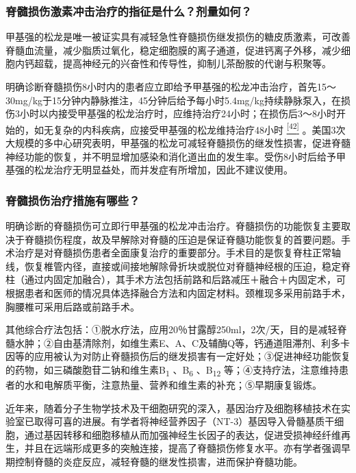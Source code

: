 \subsubsection{脊髓损伤激素冲击治疗的指征是什么？剂量如何？}

甲基强的松龙是唯一被证实具有减轻急性脊髓损伤继发损伤的糖皮质激素，可改善脊髓血流量，减少脂质过氧化，稳定细胞膜的离子通道，促进钙离子外移，减少细胞内钙超载，提高神经元的兴奋性和传导性，抑制儿茶酚胺的代谢与积聚等。

明确诊断脊髓损伤8小时内的患者应立即给予甲基强的松龙冲击治疗，首先15～30mg/kg于15分钟内静脉推注，45分钟后给予每小时5.4mg/kg持续静脉泵入，在损伤3小时以内接受甲基强的松龙治疗时，应维持治疗24小时；在损伤后3～8小时开始的，如无复杂的内科疾病，应接受甲基强的松龙维持治疗48小时
\protect\hyperlink{text00024.htmlux5cux23ch42-23}{\textsuperscript{{[}42{]}}}
。美国3次大规模的多中心研究表明，甲基强的松龙可减轻脊髓损伤的继发性损害，促进脊髓神经功能的恢复，并不明显增加感染和消化道出血的发生率。受伤8小时后给予甲基强的松龙治疗无明显益处，而并发症有所增加，因此不建议使用。

\subsubsection{脊髓损伤治疗措施有哪些？}

明确诊断的脊髓损伤可立即行甲基强的松龙冲击治疗。脊髓损伤的功能恢复主要取决于脊髓损伤程度，故及早解除对脊髓的压迫是保证脊髓功能恢复的首要问题。手术治疗是对脊髓损伤患者全面康复治疗的重要部分。手术目的是恢复脊柱正常轴线，恢复椎管内径，直接或间接地解除骨折块或脱位对脊髓神经根的压迫，稳定脊柱（通过内固定加融合），其手术方法包括前路和后路减压＋融合＋内固定术，可根据患者和医师的情况具体选择融合方法和内固定材料。颈椎现多采用前路手术，胸腰椎可采用后路或前路手术。

其他综合疗法包括：①脱水疗法，应用20％甘露醇250ml，2次/天，目的是减轻脊髓水肿；②自由基清除剂，如维生素E、A、C及辅酶Q等，钙通道阻滞剂、利多卡因等的应用被认为对防止脊髓损伤后的继发损害有一定好处；③促进神经功能恢复的药物，如三磷酸胞苷二钠和维生素B\textsubscript{1}
、B\textsubscript{6} 、B\textsubscript{12}
等；④支持疗法，注意维持患者的水和电解质平衡，注意热量、营养和维生素的补充；⑤早期康复锻炼。

近年来，随着分子生物学技术及干细胞研究的深入，基因治疗及细胞移植技术在实验室已取得可喜的进展。有学者将神经营养因子（NT-3）基因导入骨髓基质干细胞，通过基因转移和细胞移植从而加强神经生长因子的表达，促进受损神经纤维再生，并且在远端形成更多的突触连接，提高了脊髓损伤修复水平。亦有学者强调早期控制脊髓的炎症反应，减轻脊髓的继发性损害，进而保护脊髓功能。

